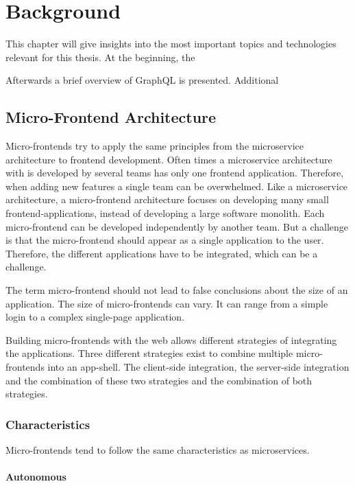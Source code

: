 \chapter{Background}

This chapter will give insights into the most important topics and technologies relevant for this thesis. At the beginning, the 

Afterwards a brief overview of GraphQL is presented. Additional

\section{Micro-Frontend Architecture}

Micro-frontends try to apply the same principles from the microservice architecture to frontend development. Often times a microservice architecture with is developed by several teams has only one frontend application. Therefore, when adding new features a single team can be overwhelmed. Like a microservice architecture, a micro-frontend architecture focuses on developing many small frontend-applications, instead of developing a large software monolith. Each micro-frontend can be developed independently by another team. But a challenge is that the micro-frontend should appear as a single application to the user. Therefore, the different applications have to be integrated, which can be a challenge.

The term micro-frontend should not lead to false conclusions about the size of an application. The size of micro-frontends can vary. It can range from a simple login to a complex single-page application.

Building micro-frontends with the web allows different strategies of integrating the applications. Three different strategies exist to combine multiple micro-frontends into an app-shell. The client-side integration, the server-side integration and the combination of these two strategies and the combination of both strategies.



\subsection{Characteristics}

Micro-frontends tend to follow the same characteristics as microservices.

\subsubsection{Autonomous}

